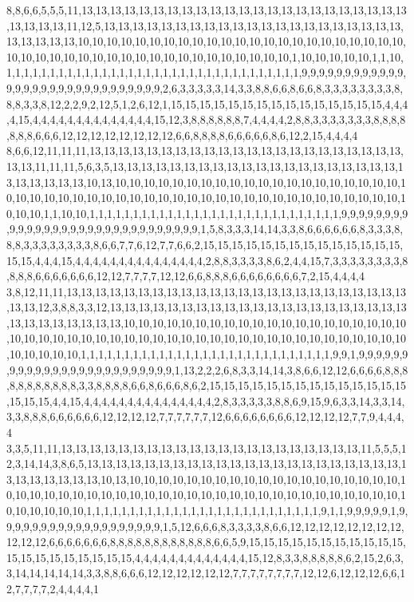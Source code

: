 8,8,6,6,5,5,5,11,13,13,13,13,13,13,13,13,13,13,13,13,13,13,13,13,13,13,13,13,13,13,13,13,13,13,13,11,12,5,13,13,13,13,13,13,13,13,13,13,13,13,13,13,13,13,13,13,13,13,13,13,13,13,13,13,10,10,10,10,10,10,10,10,10,10,10,10,10,10,10,10,10,10,10,10,10,10,10,10,10,10,10,10,10,10,10,10,10,10,10,10,10,10,10,10,10,10,10,1,10,10,10,10,10,1,1,10,1,1,1,1,1,1,1,1,1,1,1,1,1,1,1,1,1,1,1,1,1,1,1,1,1,1,1,1,1,1,1,1,1,1,9,9,9,9,9,9,9,9,9,9,9,9,9,9,9,9,9,9,9,9,9,9,9,9,9,9,9,9,9,9,2,6,3,3,3,3,3,14,3,3,8,8,6,6,8,6,6,8,3,3,3,3,3,3,3,3,8,8,8,3,3,8,12,2,2,9,2,12,5,1,2,6,12,1,15,15,15,15,15,15,15,15,15,15,15,15,15,15,15,4,4,4,4,15,4,4,4,4,4,4,4,4,4,4,4,4,4,4,15,12,3,8,8,8,8,8,8,7,4,4,4,4,2,8,8,3,3,3,3,3,3,3,8,8,8,8,8,8,8,6,6,6,12,12,12,12,12,12,12,12,6,6,8,8,8,8,6,6,6,6,6,8,6,12,2,15,4,4,4,4
8,6,6,12,11,11,11,13,13,13,13,13,13,13,13,13,13,13,13,13,13,13,13,13,13,13,13,13,13,13,13,11,11,11,5,6,3,5,13,13,13,13,13,13,13,13,13,13,13,13,13,13,13,13,13,13,13,13,13,13,13,13,13,13,10,13,10,10,10,10,10,10,10,10,10,10,10,10,10,10,10,10,10,10,10,10,10,10,10,10,10,10,10,10,10,10,10,10,10,10,10,10,10,10,10,10,10,10,10,10,10,10,10,10,10,10,10,1,1,10,10,1,1,1,1,1,1,1,1,1,1,1,1,1,1,1,1,1,1,1,1,1,1,1,1,1,1,1,1,1,9,9,9,9,9,9,9,9,9,9,9,9,9,9,9,9,9,9,9,9,9,9,9,9,9,9,9,9,9,9,1,5,8,3,3,3,14,14,3,3,8,6,6,6,6,6,6,8,3,3,3,8,8,8,3,3,3,3,3,3,3,3,8,6,6,7,7,6,12,7,7,6,6,2,15,15,15,15,15,15,15,15,15,15,15,15,15,15,15,15,4,4,4,15,4,4,4,4,4,4,4,4,4,4,4,4,4,4,4,2,8,8,3,3,3,3,8,6,2,4,4,15,7,3,3,3,3,3,3,3,3,8,8,8,8,6,6,6,6,6,6,6,12,12,7,7,7,7,12,12,6,6,8,8,8,6,6,6,6,6,6,6,6,7,2,15,4,4,4,4
3,8,12,11,11,13,13,13,13,13,13,13,13,13,13,13,13,13,13,13,13,13,13,13,13,13,13,13,13,13,13,12,3,8,8,3,3,12,13,13,13,13,13,13,13,13,13,13,13,13,13,13,13,13,13,13,13,13,13,13,13,13,13,13,13,13,13,10,10,10,10,10,10,10,10,10,10,10,10,10,10,10,10,10,10,10,10,10,10,10,10,10,10,10,10,10,10,10,10,10,10,10,10,10,10,10,10,10,10,10,10,10,10,10,10,10,10,10,10,10,1,1,1,1,1,1,1,1,1,1,1,1,1,1,1,1,1,1,1,1,1,1,1,1,1,1,1,1,1,9,9,1,9,9,9,9,9,9,9,9,9,9,9,9,9,9,9,9,9,9,9,9,9,9,9,9,9,1,13,2,2,2,6,8,3,3,14,14,3,8,6,6,12,12,6,6,6,6,8,8,8,8,8,8,8,8,8,8,8,3,3,8,8,8,8,6,6,8,6,6,6,8,6,2,15,15,15,15,15,15,15,15,15,15,15,15,15,15,15,15,15,4,4,15,4,4,4,4,4,4,4,4,4,4,4,4,4,4,4,2,8,3,3,3,3,3,8,8,6,9,15,9,6,3,3,14,3,3,14,3,3,8,8,8,6,6,6,6,6,6,12,12,12,12,7,7,7,7,7,7,12,6,6,6,6,6,6,6,6,12,12,12,12,7,7,9,4,4,4,4
3,3,5,11,11,13,13,13,13,13,13,13,13,13,13,13,13,13,13,13,13,13,13,13,13,13,11,5,5,5,12,3,14,14,3,8,6,5,13,13,13,13,13,13,13,13,13,13,13,13,13,13,13,13,13,13,13,13,13,13,13,13,13,13,13,13,13,10,13,10,10,10,10,10,10,10,10,10,10,10,10,10,10,10,10,10,10,10,10,10,10,10,10,10,10,10,10,10,10,10,10,10,10,10,10,10,10,10,10,10,10,10,10,10,10,10,10,10,10,10,10,10,1,1,1,1,1,1,1,1,1,1,1,1,1,1,1,1,1,1,1,1,1,1,1,1,1,1,1,9,1,1,9,9,9,9,9,1,9,9,9,9,9,9,9,9,9,9,9,9,9,9,9,9,9,9,9,1,5,12,6,6,6,8,3,3,3,3,8,6,6,12,12,12,12,12,12,12,12,12,12,12,6,6,6,6,6,6,6,8,8,8,8,8,8,8,8,8,8,8,8,6,6,5,9,15,15,15,15,15,15,15,15,15,15,15,15,15,15,15,15,15,15,15,15,4,4,4,4,4,4,4,4,4,4,4,4,4,15,12,8,3,3,8,8,8,8,8,6,2,15,2,6,3,3,14,14,14,14,14,3,3,8,8,6,6,6,12,12,12,12,12,12,7,7,7,7,7,7,7,7,12,12,6,12,12,12,6,6,12,7,7,7,7,2,4,4,4,4,1
